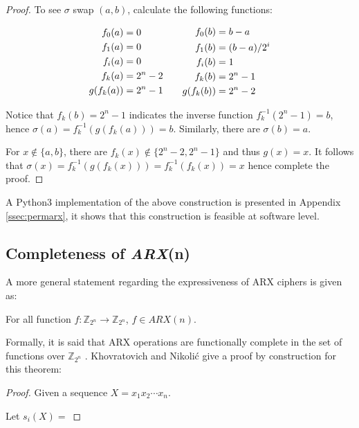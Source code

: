 \begin{proof}
To see $\sigma$ swap $(a,b)$, calculate the following functions:

\begin{equation*}
\setlength{\abovedisplayshortskip}{0em}
\setlength{\abovedisplayskip}{0em}
\begin{split}
f_0(a) &= 0\\
f_1(a) &= 0\\
f_i(a) &= 0\\
f_k(a) &= 2^n-2\\
g(f_k(a)) &= 2^n-1\\
\end{split}
\quad\quad
\begin{split}
f_0(b) &= b-a\\
f_1(b) &= (b-a)/2^i\\
f_i(b) &= 1\\
f_k(b) &= 2^n-1\\
g(f_k(b)) &= 2^n-2\\
\end{split}
\end{equation*}

\noindent Notice that $f_k(b)=2^n-1$ indicates the inverse function $f_k^{-1}(2^n-1)=b$,
hence $\sigma(a)=f_k^{-1}(g(f_k(a)))=b$. Similarly, there are $\sigma(b)=a$.

For $x\notin\{a,b\}$, there are $f_k(x)\notin\{2^n-2,2^n-1\}$ and thus $g(x)=x$. It
follows that $\sigma(x)=f_k^{-1}(g(f_k(x)))=f_k^{-1}(f_k(x))=x$ hence complete the proof.
\end{proof}

A Python3 implementation of the above construction is presented in Appendix
\ref{ssec:permarx}, it shows that this construction is feasible at software level.

\subsection{Completeness of \textbf{\textit{ARX}(n)}}

A more general statement regarding the expressiveness of ARX ciphers is given as:

\begin{theorem}
\label{thm:func}
For all function $f:\mathbb{Z}_{2^n}\rightarrow\mathbb{Z}_{2^n}$, $f\in\textit{ARX}(n)$.
\end{theorem}

Formally, it is said that ARX operations are functionally complete in the set of
functions over $\mathbb{Z}_{2^n}$ \cite{khovratovich2010rotational}. Khovratovich and
Nikoli{\'c} give a proof by construction for this theorem:

\begin{proof}
Given a sequence $X=x_1x_2\cdots x_n$. 

Let $s_i(X)=$
\end{proof}
